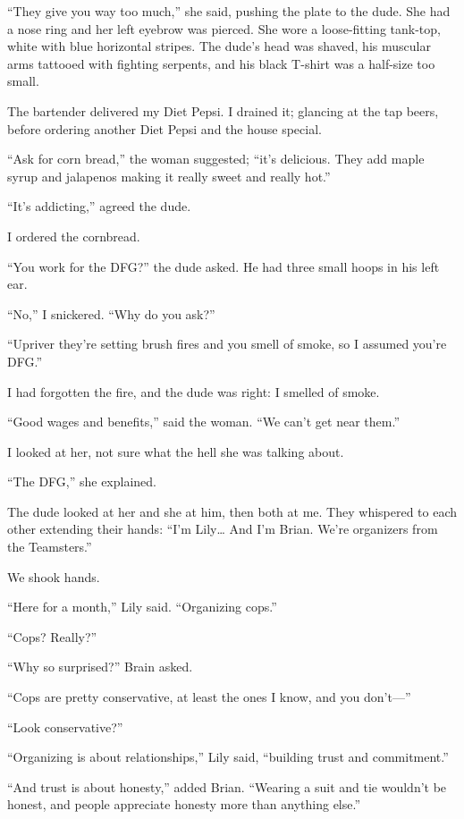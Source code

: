 ``They give you way too much,'' she said, pushing the plate to the dude.
She had a nose ring and her left eyebrow was pierced. She wore a
loose-fitting tank-top, white with blue horizontal stripes. The dude's
head was shaved, his muscular arms tattooed with fighting serpents, and
his black T-shirt was a half-size too small.

The bartender delivered my Diet Pepsi. I drained it; glancing at the tap
beers, before ordering another Diet Pepsi and the house special.

``Ask for corn bread,'' the woman suggested; ``it's delicious. They add
maple syrup and jalapenos making it really sweet and really hot.''

``It's addicting,'' agreed the dude.

I ordered the cornbread.

``You work for the DFG?'' the dude asked. He had three small hoops in
his left ear.

``No,'' I snickered. ``Why do you ask?''

``Upriver they're setting brush fires and you smell of smoke, so I
assumed you're DFG.''

I had forgotten the fire, and the dude was right: I smelled of smoke.

``Good wages and benefits,'' said the woman. ``We can't get near them.''

I looked at her, not sure what the hell she was talking about.

``The DFG,'' she explained.

The dude looked at her and she at him, then both at me. They whispered
to each other extending their hands: ``I'm Lily\ldots{} And I'm Brian.
We're organizers from the Teamsters.''

We shook hands.

``Here for a month,'' Lily said. ``Organizing cops.''

``Cops? Really?''

``Why so surprised?'' Brain asked.

``Cops are pretty conservative, at least the ones I know, and you
don't---''

``Look conservative?''

``Organizing is about relationships,'' Lily said, ``building trust and
commitment.''

``And trust is about honesty,'' added Brian. ``Wearing a suit and tie
wouldn't be honest, and people appreciate honesty more than anything
else.''

